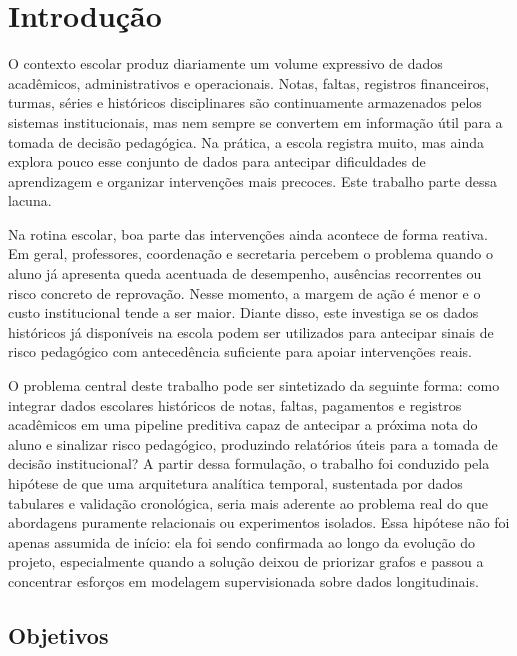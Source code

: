 \chapter{Introdu\c{c}\~ao}
\label{cap:introducao}

O contexto escolar produz diariamente um volume expressivo de dados acad\^emicos, administrativos e operacionais. Notas, faltas, registros financeiros, turmas, s\'eries e hist\'oricos disciplinares s\~ao continuamente armazenados pelos sistemas institucionais, mas nem sempre se convertem em informa\c{c}\~ao \'util para a tomada de decis\~ao pedag\'ogica. Na pr\'atica, a escola registra muito, mas ainda explora pouco esse conjunto de dados para antecipar dificuldades de aprendizagem e organizar interven\c{c}\~oes mais precoces. Este trabalho parte dessa lacuna.

Na rotina escolar, boa parte das interven\c{c}\~oes ainda acontece de forma reativa. Em geral, professores, coordena\c{c}\~ao e secretaria percebem o problema quando o aluno j\'a apresenta queda acentuada de desempenho, aus\^encias recorrentes ou risco concreto de reprova\c{c}\~ao. Nesse momento, a margem de a\c{c}\~ao \'e menor e o custo institucional tende a ser maior. Diante disso, este  investiga se os dados hist\'oricos j\'a dispon\'iveis na escola podem ser utilizados para antecipar sinais de risco pedag\'ogico com anteced\^encia suficiente para apoiar interven\c{c}\~oes reais.

O problema central deste trabalho pode ser sintetizado da seguinte forma: como integrar dados escolares hist\'oricos de notas, faltas, pagamentos e registros acad\^emicos em uma pipeline preditiva capaz de antecipar a pr\'oxima nota do aluno e sinalizar risco pedag\'ogico, produzindo relat\'orios \'uteis para a tomada de decis\~ao institucional? A partir dessa formula\c{c}\~ao, o trabalho foi conduzido pela hip\'otese de que uma arquitetura anal\'itica temporal, sustentada por dados tabulares e valida\c{c}\~ao cronol\'ogica, seria mais aderente ao problema real do que abordagens puramente relacionais ou experimentos isolados. Essa hip\'otese n\~ao foi apenas assumida de in\'icio: ela foi sendo confirmada ao longo da evolu\c{c}\~ao do projeto, especialmente quando a solu\c{c}\~ao deixou de priorizar grafos e passou a concentrar esfor\c{c}os em modelagem supervisionada sobre dados longitudinais.


\section{Objetivos}
\label{sec:objetivos}

